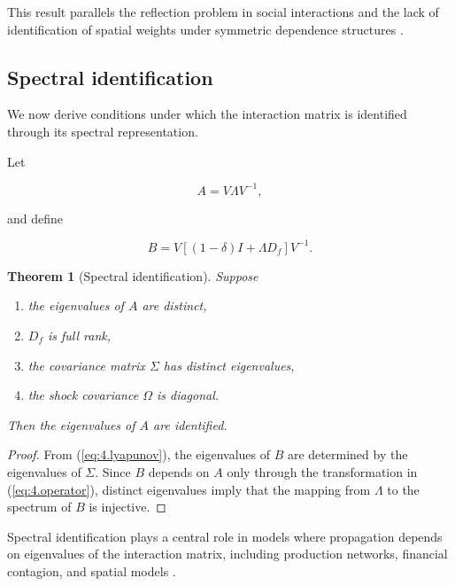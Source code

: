 \documentclass[12pt]{article}
\numberwithin{equation}{section}
\newtheorem{theorem}{Theorem}[section]
\begin{document}
This result parallels the reflection problem in social interactions
\citep{manski1993identification} and the lack of identification of spatial
weights under symmetric dependence structures
\citep{anselin1988spatial}.

\subsection{Spectral identification}

We now derive conditions under which the interaction matrix is identified
through its spectral representation.

Let

\begin{equation}
A
=
V \Lambda V^{-1},
\label{eq:4.spectralA}
\end{equation}

and define

\begin{equation}
B
=
V
\left[
(1-\delta) I
+
\Lambda D_f
\right]
V^{-1}.
\label{eq:4.spectralB}
\end{equation}

\begin{theorem}[Spectral identification]
Suppose

\begin{enumerate}
\item the eigenvalues of $A$ are distinct,
\item $D_f$ is full rank,
\item the covariance matrix $\Sigma$ has distinct eigenvalues,
\item the shock covariance $\Omega$ is diagonal.
\end{enumerate}

Then the eigenvalues of $A$ are identified.
\end{theorem}

\begin{proof}
From (\ref{eq:4.lyapunov}), the eigenvalues of $B$ are determined by the
eigenvalues of $\Sigma$. Since $B$ depends on $A$ only through the
transformation in (\ref{eq:4.operator}), distinct eigenvalues imply that
the mapping from $\Lambda$ to the spectrum of $B$ is injective.
\end{proof}

Spectral identification plays a central role in models where propagation
depends on eigenvalues of the interaction matrix, including production
networks, financial contagion, and spatial models
\citep{acemoglu2012network, acemoglu2015systemic, elliott2014financial}.
\end{document}

